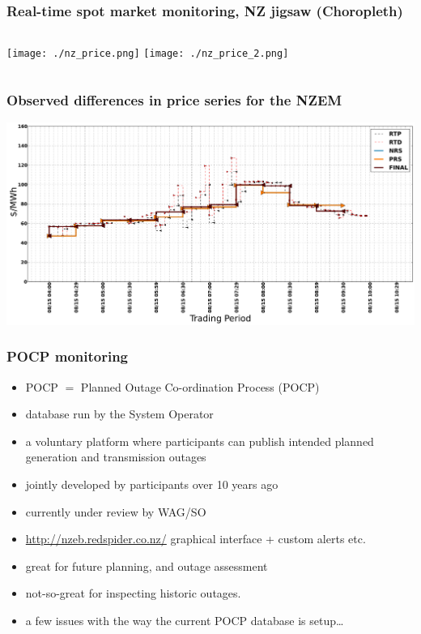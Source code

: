 \documentclass[aspectratio=169]{beamer}
\begin{document}
\frame
{\frametitle{Real-time spot market monitoring, NZ jigsaw (Choropleth)}
\begin{columns}[t]
  \column[T]{5cm}
     \texttt{[image: ./nz\_price.png]} 
  \column[T]{5cm}
  \vspace{0mm}
     \texttt{[image: ./nz\_price\_2.png]} 
\end{columns}

}

\frame
{\frametitle{Observed differences in price series for the NZEM}
\begin{center}
\includegraphics[width=14.5cm]{./notebooks/125_years_of_data_files/125_years_of_data_fig_06.pdf} 
\end{center}
}

\begin{frame}[fragile]
  \frametitle{POCP monitoring}

\begin{itemize}
   \item POCP $=$ Planned Outage Co-ordination Process (POCP) 
   \item database run by the System Operator
   \item a voluntary platform where participants can publish intended planned generation and transmission outages
   \item jointly developed by participants over 10 years ago  
   \item currently under review by WAG/SO 
   \item \url{http://nzeb.redspider.co.nz/} graphical interface + custom alerts etc.  
   \item great for future planning, and outage assessment
   \item not-so-great for inspecting historic outages.   
   \item a few issues with the way the current POCP database is setup\ldots 
\end{itemize}

\end{frame}
\end{document}
